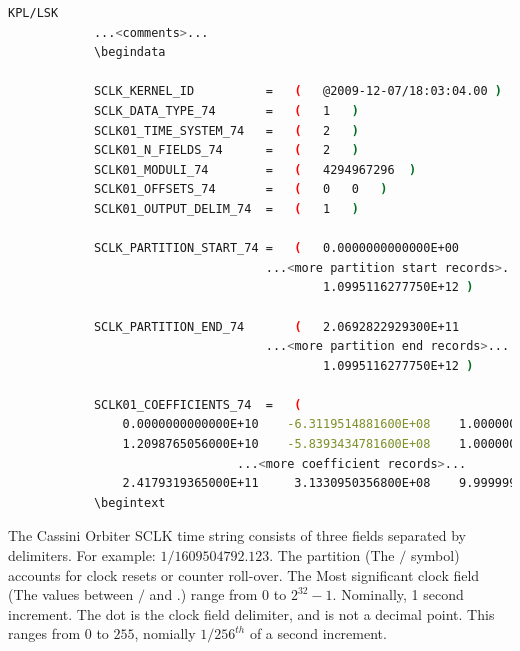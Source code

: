 \documentclass[crop=false,class=book]{standalone}
\begin{document}
            \begin{lstlisting}[language=bash,basicstyle=\footnotesize]
            KPL/LSK
            ...<comments>...
            \begindata
            
            SCLK_KERNEL_ID          =   (   @2009-12-07/18:03:04.00 )
            SCLK_DATA_TYPE_74       =   (   1   )
            SCLK01_TIME_SYSTEM_74   =   (   2   )
            SCLK01_N_FIELDS_74      =   (   2   )
            SCLK01_MODULI_74        =   (   4294967296  )
            SCLK01_OFFSETS_74       =   (   0   0   )
            SCLK01_OUTPUT_DELIM_74  =   (   1   )
            
            SCLK_PARTITION_START_74 =   (   0.0000000000000E+00
                                    ...<more partition start records>...
                                            1.0995116277750E+12 )
            
            SCLK_PARTITION_END_74       (   2.0692822929300E+11
                                    ...<more partition end records>...
                                            1.0995116277750E+12 )
            
            SCLK01_COEFFICIENTS_74  =   (
                0.0000000000000E+10    -6.3119514881600E+08    1.0000000000000E+10
                1.2098765056000E+10    -5.8393434781600E+08    1.0000000000000E+10
                                ...<more coefficient records>...
                2.4179319365000E+11     3.1330950356800E+08    9.9999997500000E+-01 )
            \begintext
            \end{lstlisting}
            \begin{example}
            The Cassini Orbiter SCLK time string consists of three fields separated by delimiters. For example: $1/1609504792.123$. The partition (The $/$ symbol) accounts for clock resets or counter roll-over. The Most significant clock field (The values between $/$ and $.$) range from $0$ to $2^{32}-1$. Nominally, 1 second increment. The dot is the clock field delimiter, and is not a decimal point. This ranges from $0$ to $255$, nomially $1/256^{th}$ of a second increment.
            \end{example}
\end{document}
